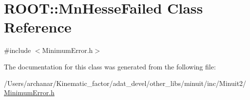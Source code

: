 \hypertarget{classROOT_1_1Minuit2_1_1MinimumError_1_1MnHesseFailed}{}\section{R\+O\+OT\+:\+:Mn\+Hesse\+Failed Class Reference}
\label{classROOT_1_1Minuit2_1_1MinimumError_1_1MnHesseFailed}


{\ttfamily \#include $<$Minimum\+Error.\+h$>$}



The documentation for this class was generated from the following file\+:\begin{DoxyCompactItemize}
\item 
/\+Users/archanar/\+Kinematic\+\_\+factor/adat\+\_\+devel/other\+\_\+libs/minuit/inc/\+Minuit2/\mbox{\hyperlink{other__libs_2minuit_2inc_2Minuit2_2MinimumError_8h}{Minimum\+Error.\+h}}\end{DoxyCompactItemize}
